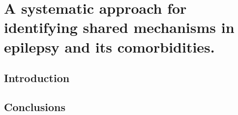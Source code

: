 \chapter{A systematic approach for identifying shared mechanisms in epilepsy and its comorbidities.}\label{chap:epicom}

\section*{Introduction}

\vspace*{\fill}



\section*{Conclusions}
